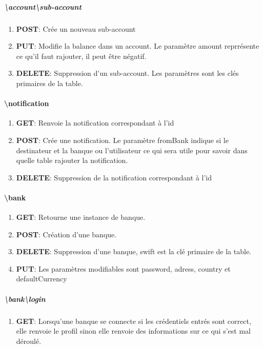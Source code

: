 \documentclass{article}
\begin{document}
    \subparagraph{\textbackslash account\textbackslash sub-account}
        \begin{enumerate}
            \item \textbf{POST}: Crée un nouveau sub-account
            \item \textbf{PUT}: Modifie la balance dans un account. Le paramètre amount reprrésente ce qu'il faut
                                rajouter, il peut être négatif.
            \item \textbf{DELETE}: Suppression d'un sub-account. Les paramètres sont les clés primaires de la table.
        \end{enumerate}


\paragraph{\textbackslash notification}
    \begin{enumerate}
        \item \textbf{GET}: Renvoie la notification correspondant à l'id
        \item \textbf{POST}: Crée une notification. Le paramètre fromBank indique si le destinateur et la banque
                            ou l'utilisateur ce qui sera utile pour savoir dans quelle table rajouter la notification.
        \item \textbf{DELETE}: Suppression de la notification correspondant à l'id
    \end{enumerate}


\paragraph{\textbackslash bank}
    \begin{enumerate}
        \item \textbf{GET}: Retourne une instance de banque.
        \item \textbf{POST}: Création d'une banque.
        \item \textbf{DELETE}: Suppression d'une banque, swift est la clé primaire de la table.
        \item \textbf{PUT}: Les paramètres modifiables sont password, adress, country et defaultCurrency
    \end{enumerate}

    \subparagraph{\textbackslash bank\textbackslash login}
        \begin{enumerate}
            \item \textbf{GET}: Lorsqu'une banque se connecte si les crédentiels entrés sont correct, elle renvoie
                                le profil sinon elle renvoie des informations sur ce qui s'est mal déroulé.
        \end{enumerate}
\end{document}
